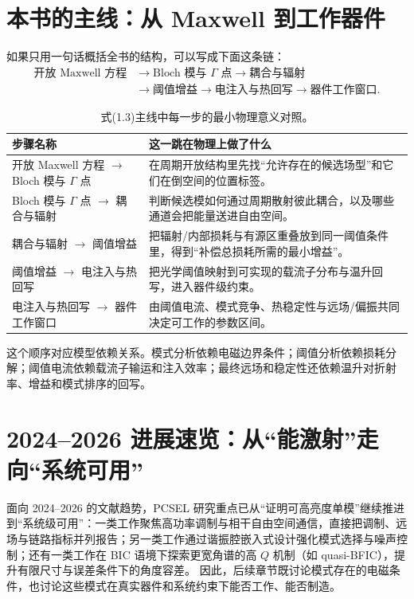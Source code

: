 \section{本书的主线：从 Maxwell 到工作器件}
如果只用一句话概括全书的结构，可以写成下面这条链：
\begin{equation}
\begin{aligned}
\text{开放 Maxwell 方程}
&\rightarrow
\text{Bloch 模与 }\Gamma\text{ 点}
\rightarrow
\text{耦合与辐射}
\\
&\rightarrow
\text{阈值增益}
\rightarrow
\text{电注入与热回写}
\rightarrow
\text{器件工作窗口}.
\end{aligned}
\end{equation}

\begin{table}[htbp]
  \centering
  \footnotesize
  \caption{式(1.3)主线中每一步的最小物理意义对照。}
  \label{tab:ch01_chain_step_meaning}
  \setlength{\tabcolsep}{5pt}
  \begin{tabularx}{0.96\textwidth}{@{}p{3.7cm}Y@{}}
    \toprule
    步骤名称 & 这一跳在物理上做了什么 \\
    \midrule
    开放 Maxwell 方程 $\rightarrow$ Bloch 模与 $\Gamma$ 点 & 在周期开放结构里先找“允许存在的候选场型”和它们在倒空间的位置标签。 \\
    Bloch 模与 $\Gamma$ 点 $\rightarrow$ 耦合与辐射 & 判断候选模如何通过周期散射彼此耦合，以及哪些通道会把能量送进自由空间。 \\
    耦合与辐射 $\rightarrow$ 阈值增益 & 把辐射/内部损耗与有源区重叠放到同一阈值条件里，得到“补偿总损耗所需的最小增益”。 \\
    阈值增益 $\rightarrow$ 电注入与热回写 & 把光学阈值映射到可实现的载流子分布与温升回写，进入器件级约束。 \\
    电注入与热回写 $\rightarrow$ 器件工作窗口 & 由阈值电流、模式竞争、热稳定性与远场/偏振共同决定可工作的参数区间。 \\
    \bottomrule
  \end{tabularx}
\end{table}

这个顺序对应模型依赖关系。模式分析依赖电磁边界条件；阈值分析依赖损耗分解；阈值电流依赖载流子输运和注入效率；最终远场和稳定性还依赖温升对折射率、增益和模式排序的回写。

\section{2024–2026 进展速览：从“能激射”走向“系统可用”}
面向 2024–2026 的文献趋势，PCSEL 研究重点已从“证明可高亮度单模”继续推进到“系统级可用”：一类工作聚焦高功率调制与相干自由空间通信，直接把调制、远场与链路指标并列报告\cite{inoue2025fmpcsel}；另一类工作通过谐振腔嵌入式设计强化模式选择与噪声控制\cite{bian2024resonatorpcsel}；还有一类工作在 BIC 语境下探索更宽角谱的高 $Q$ 机制（如 quasi-BFIC），提升有限尺寸与误差条件下的角度容差\cite{qin2025quasibfic}。  
因此，后续章节既讨论模式存在的电磁条件，也讨论这些模式在真实器件和系统约束下能否工作、能否制造。

